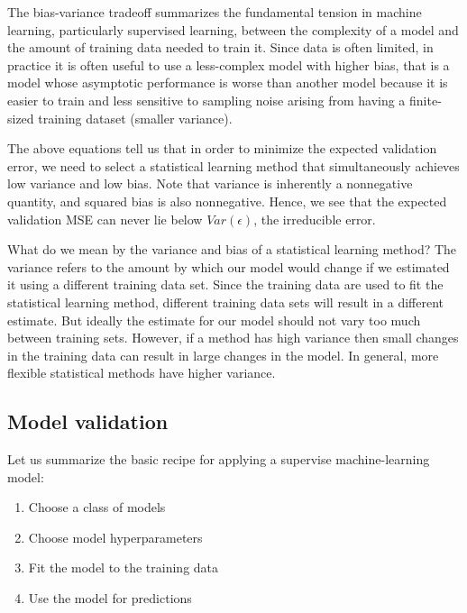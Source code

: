 \documentclass[%
oneside,                 %
final,                   %
10pt]{article}
\begin{document}
The bias-variance tradeoff summarizes the fundamental tension in
machine learning, particularly supervised learning, between the
complexity of a model and the amount of training data needed to train
it.  Since data is often limited, in practice it is often useful to
use a less-complex model with higher bias, that is  a model whose asymptotic
performance is worse than another model because it is easier to
train and less sensitive to sampling noise arising from having a
finite-sized training dataset (smaller variance). 



The above equations tell us that in
order to minimize the expected validation error, we need to select a
statistical learning method that simultaneously achieves low variance
and low bias. Note that variance is inherently a nonnegative quantity,
and squared bias is also nonnegative. Hence, we see that the expected
validation MSE can never lie below $Var(\epsilon)$, the irreducible error.


What do we mean by the variance and bias of a statistical learning
method? The variance refers to the amount by which our model would change if we
estimated it using a different training data set. Since the training
data are used to fit the statistical learning method, different
training data sets  will result in a different estimate. But ideally the
estimate for our model should not vary too much between training
sets. However, if a method has high variance  then small changes in
the training data can result in large changes in the model. In general, more
flexible statistical methods have higher variance.


\subsection{Model validation}

Let us summarize the basic recipe for applying a supervise machine-learning model:

\begin{enumerate}
 \item Choose a class of models

 \item Choose model hyperparameters

 \item Fit the model to the training data

 \item Use the model for predictions
\end{enumerate}
\end{document}
